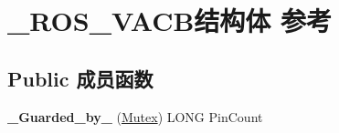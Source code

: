 \hypertarget{struct___r_o_s___v_a_c_b}{}\section{\+\_\+\+R\+O\+S\+\_\+\+V\+A\+C\+B结构体 参考}
\label{struct___r_o_s___v_a_c_b}
\subsection*{Public 成员函数}
\begin{DoxyCompactItemize}
\item 
\mbox{\label{struct___r_o_s___v_a_c_b_a4dd2657c3cc7f107f749041c146bde2c}} 
{\bfseries \+\_\+\+Guarded\+\_\+by\+\_\+} (\hyperlink{class_mutex}{Mutex}) L\+O\+NG Pin\+Count
\end{DoxyCompactItemize}
